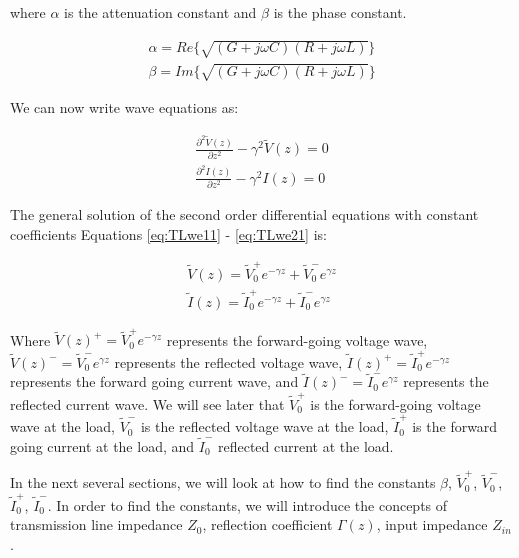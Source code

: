 \documentclass{ximera}
\begin{document}
where $\alpha$ is the attenuation constant and $\beta$ is the phase
constant.

\begin{eqnarray}
\alpha=Re\{ \sqrt{(G+j\omega C)  (R+j\omega L)  }  \} \nonumber \\ \nonumber
\beta = Im\{ \sqrt{(G+j\omega C)  (R+j\omega L)  }  \}
\end{eqnarray}

We can now write wave equations as:


\begin{eqnarray}
\frac{\partial^2 \tilde{V}(z)}{\partial z^2} -\gamma^2
 \tilde{V}(z)=0  \label{eq:TLwe11} \\ 
\frac{\partial^2 I(z)}{\partial z^2}- \gamma^2
I(z)=0 \label{eq:TLwe21}
\end{eqnarray}


The general solution of the second order differential equations with constant coefficients
Equations \ref{eq:TLwe11} - \ref{eq:TLwe21}   is:

\begin{eqnarray}
\tilde{V}(z)=\tilde{V}_0^+ e^{-\gamma z} + \tilde{V}_0^- e^{\gamma z} \nonumber \\ \nonumber
\tilde{I}(z)=\tilde{I}_0^+ e^{-\gamma z} + \tilde{I}_0^- e^{\gamma z}
\end{eqnarray}

Where $\tilde{V}(z)^+=\tilde{V}_0^+ e^{-\gamma z}$ represents the forward-going voltage wave, $\tilde{V}(z)^-=\tilde{V}_0^- e^{\gamma z}$ represents the reflected voltage wave, $\tilde{I}(z)^+=\tilde{I}_0^+ e^{-\gamma z}$ represents the forward going current wave, and $\tilde{I}(z)^-=\tilde{I}_0^- e^{\gamma z}$ represents the reflected current wave. We will see later that $\tilde{V}_0^+$ is the forward-going voltage wave at the load, $\tilde{V}_0^-$ 
is the reflected voltage wave at the load, $\tilde{I}_0^+$ is the forward going current at the load, and $\tilde{I}_0^-$ reflected current at the load.


In the next several sections, we will look at how to find the constants $\beta$, $\tilde{V}_0^+  $, $ \tilde{V}_0^-$, $\tilde{I}_0^+ $, $\tilde{I}_0^-$. In order to find the constants, we will introduce the concepts of transmission line impedance $Z_0$, reflection coefficient $\Gamma(z)$, input impedance $Z_{in}$. 
\end{document}
